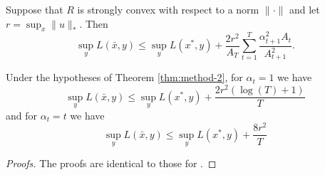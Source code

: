 \documentclass[paper.tex]{subfiles}
\begin{document}
\begin{theorem}
\label{thm:method-2}
Suppose that $R$ is strongly convex with respect to a norm $\|\cdot\|$ 
and let $r = \sup_{x} \|u\|_{*}$. Then 
\[ \sup_{y} L(\bar{x}, y) \leq \sup_{y} L(x^*, y) + \frac{2r^2}{A_T} \sum_{t=1}^T \frac{\alpha_{t+1}^2A_t}{A_{t+1}^2}. \]
\end{theorem}
\begin{corollary}
\label{cor:method-2}
Under the hypotheses of Theorem \ref{thm:method-2}, for $\alpha_t = 1$ we have
\[ \sup_{y} L(\bar{x}, y) \leq \sup_{y} L(x^*, y) + \frac{2r^2(\log(T) + 1)}{T} \]
and for $\alpha_t = t$ we have
\[ \sup_{y} L(\bar{x}, y) \leq \sup_{y} L(x^*, y) + \frac{8r^2}{T} \]
\end{corollary}
\begin{proof}[Proofs]
The proofs are identical to those for \primal.
\end{proof}
\end{document}
